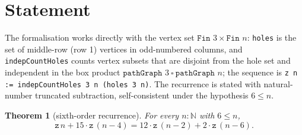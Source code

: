 \documentclass[11pt]{article}
\newtheorem{theorem}{Theorem}
\begin{document}
\section{Statement}\label{sec:statement}

The formalisation works directly with the vertex set
$\texttt{Fin }3 \times \texttt{Fin }n$: \texttt{holes} is the set of
middle-row (row 1) vertices in odd-numbered columns, and
\texttt{indepCountHoles} counts vertex subsets that are disjoint from the
hole set and independent in the box product
$\texttt{pathGraph }3\ \square\ \texttt{pathGraph }n$; the sequence is
\texttt{z n := indepCountHoles 3 n (holes 3 n)}. The recurrence is stated
with natural-number truncated subtraction, self-consistent under the
hypothesis $6 \le n$.

\begin{theorem}[sixth-order recurrence]\label{thm:rec}
For every $n : \mathbb{N}$ with $6 \le n$,
\[
\texttt{z}\,n + 15 \cdot \texttt{z}\,(n-4) = 12 \cdot \texttt{z}\,(n-2) +
2 \cdot \texttt{z}\,(n-6).
\]
\end{theorem}
\end{document}
